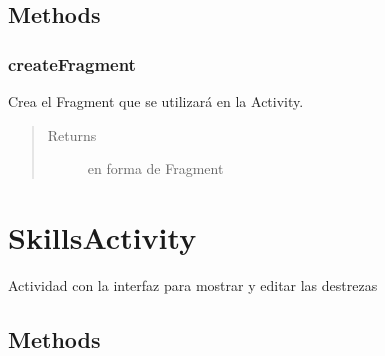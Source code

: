 \documentclass[letterpaper,10pt,english]{sphinxmanual}
\begin{document}
\subsection{Methods}
\label{Activities/AddContactActivity:methods}

\subsubsection{createFragment}
\label{Activities/AddContactActivity:createfragment}

\begin{fulllineitems}
\label{Activities/AddContactActivity:com.fiuba.tallerii.jobify.AddContactActivity.createFragment()}
Crea el Fragment que se utilizará en la Activity.
\begin{quote}\begin{description}
\item[{Returns}] \leavevmode
{} en forma de Fragment

\end{description}\end{quote}

\end{fulllineitems}



\section{SkillsActivity}
\label{Activities/SkillsActivity:skillsactivity}\label{Activities/SkillsActivity::doc}

\begin{fulllineitems}
\label{Activities/SkillsActivity:com.fiuba.tallerii.jobify.SkillsActivity}
Actividad con la interfaz para mostrar y editar las destrezas

\end{fulllineitems}



\subsection{Methods}
\label{Activities/SkillsActivity:methods}
\end{document}
